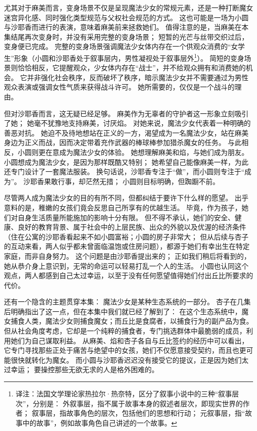 尤其对于麻美而言，变身场景不仅是呈现魔法少女的常规元素，还是一种打断魔女迷宫异化感、同时强化类型规范与父权社会规范的方式。
这也可能是一场为小圆与沙耶香而进行的表演，意味着麻美前来拯救她们。
值得注意的是，当麻美在本集结尾再次变身时，并没有采用完整的变身场景；
短暂的光芒与丝带交织过后，变身便已完成。
完整的变身场景强调魔法少女体内存在一个供观众消费的“女学生”形象（小圆和沙耶香处于叙事层内，男性凝视处于叙事层外\footnote{%
    译注：法国文学理论家热拉尔·热奈特，区分了叙事小说中的三种“叙事层次”，分别是：
    外叙事层，指不属于故事本身的叙述者层次，即现实世界的作者；
    叙事层，指故事角色的层次，包括他们的思想和行动；
    元叙事层，指“故事中的故事”，例如故事角色自己讲述的一个故事。
}）。
简短的变身场景则恰恰相反，它提醒观众，少女体内存在“战士”，并不给观众拥有和消费她的机会。
它并非强化社会秩序，反而破坏了秩序，暗示魔法少女并不需要通过为男性观众表演或强调女性气质来获得战斗许可。
她所需要的，仅仅是一个战斗的理由。

但对沙耶香而言，这无疑已经足够。
麻美作为无辜者的守护者这一形象立刻吸引了她；
她毫不犹豫地支持麻美，讨厌焰。
对她来说，魔法少女代表着一种明确的善恶对抗。
她迫不及待地想站在正义的一方，渴望成为一名魔法少女，站在麻美身边为正义而战，因而决定带着充作武器的棒球棒参加猎杀魔女的任务。
与此相反，小圆则更在意成为魔法少女的体验。
她想理解麻美和焰，与她们成为朋友。
小圆想成为魔法少女，是因为那样既酷又特别；
她希望自己能像麻美一样，为此还专门设计了一套魔法服装。
换句话说，沙耶香专注于“做”，而小圆则专注于“成为”。
沙耶香果敢行事，却茫然无措；
小圆则目标明确，但踟蹰不前。

尽管两人成为魔法少女的目的有所不同，但都纠结于要许下什么样的愿望。
出乎意料的是，稚嫩的女孩们竟会反思自己所享有的优越生活。
毕竟，作为孩子，她们对自身生活质量所能施加的影响十分有限。
但不得不承认，她们的安全、健康、良好的教育背景、属于社会中的上层民族、出众的外貌以及优渥的经济条件（住在公寓的沙耶香看起来不如小圆富裕；小圆的房子非常大；
但从后续与杏子的互动来看，两人似乎都未曾面临温饱或住房问题），都源于她们有幸出生在特定家庭，而非自身努力。
这个问题是由沙耶香提出来的；
正如我们稍后将看到的，她从恭介身上意识到，无常的命运可以轻易打乱一个人的生活。
小圆也认同这个观点，两人都感到自己太过幸运，以至于没有任何愿望值得她们付出丘比所要求的代价。

还有一个隐含的主题贯穿本集：
魔法少女是某种生态系统的一部分。
杏子在几集后明确指出了这一点，但在本集中我们就已经了解到了：
在这个生态系统中，魔女捕食人类，魔法少女则捕食魔女；而丘比是食腐者，以捕食行为的副产品为食。
但从社会角度考虑，它却是一个纯粹的捕食者，专门挑选群体中最脆弱的成员，利用她们为自己谋取利益。
从麻美、焰和杏子各自与丘比签约的经历中可以看出，它专门寻找那些正处于痛苦与绝望中的女孩，她们不仅愿意接受契约，而且也更可能很快就转化为魔女。
而小圆与沙耶香迟迟没有接受它的提议，正是因为她们太过幸运；
要操控那些无欲无求的人是格外困难的。

